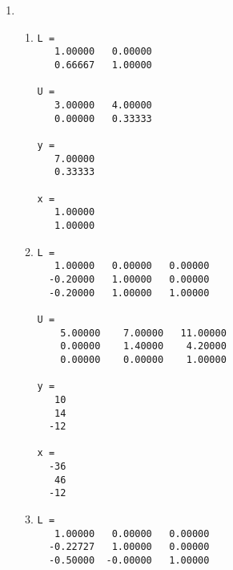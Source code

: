 \documentclass[a4paper]{article}
\begin{document}
\section{}
\begin{enumerate}
\item
  \begin{enumerate}
  \item %
\begin{verbatim}
L =
   1.00000   0.00000
   0.66667   1.00000

U =
   3.00000   4.00000
   0.00000   0.33333

y =
   7.00000
   0.33333

x =
   1.00000
   1.00000
\end{verbatim}

  \item %
\begin{verbatim}
L =
   1.00000   0.00000   0.00000
  -0.20000   1.00000   0.00000
  -0.20000   1.00000   1.00000

U =
    5.00000    7.00000   11.00000
    0.00000    1.40000    4.20000
    0.00000    0.00000    1.00000

y =
   10
   14
  -12

x =
  -36
   46
  -12
\end{verbatim}

  \item %
\begin{verbatim}
L =
   1.00000   0.00000   0.00000
  -0.22727   1.00000   0.00000
  -0.50000  -0.00000   1.00000


\end{verbatim}
\end{enumerate}
\end{enumerate}
\end{document}
